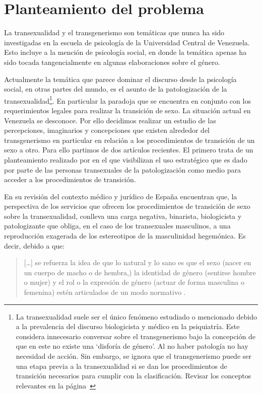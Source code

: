 \section{Planteamiento del problema}

La transexualidad y el transgenerismo son temáticas que nunca ha sido
investigadas en la escuela de psicología de la Universidad Central de Venezuela. Esto incluye a la mención de psicología
social, en donde la temática apenas ha sido tocada tangencialmente en algunas
elaboraciones sobre el género.

Actualmente la temática que parece dominar el discurso desde la psicología
social, en otras partes del mundo, es el asunto de la patologización de la
transexualidad\footnote{La transexualidad suele ser el único fenómeno estudiado
o mencionado debido a la prevalencia del discurso biologicista y médico en la
psiquiatría. Este considera innecesario conversar sobre el transgenerismo bajo
la concepción de que en este no existe una ‘disforía de género’. Al no haber
patología no hay necesidad de acción. Sin embargo, se ignora que el
transgenerismo puede ser una etapa previa a la transexualidad si se dan los
procedimientos de transición necesarios para cumplir con la clasificación.
Revisar los conceptos relevantes en la página~\pageref{diferencia}}. En
particular la paradoja que se encuentra en conjunto con los requerimientos
legales para realizar la transición de sexo. La situación actual en Venezuela se
desconoce. Por ello decidimos realizar un estudio de las percepciones,
imaginarios y concepciones que existen alrededor del transgenerismo en
particular en relación a los procedimientos de transición de un sexo a otro.
Para ello partimos de dos artículos recientes. El primero trata de un
planteamiento realizado por \textcite{Coll-Planas2015} en el que visibilizan el
uso estratégico que es dado por parte de las personas transexuales de la
patologización como medio para acceder a los procedimientos de transición.

En su revisión del contexto médico y jurídico de España encuentran que, la
perspectiva de los servicios que ofrecen los procedimientos de transición de
sexo sobre la transexualidad, conlleva una carga negativa, binarista,
biologicista y patologizante que obliga, en el caso de los transexuales
masculinos, a una reproducción exagerada de los estereotipos de la masculinidad
hegemónica. Es decir, debido a que:

\begin{quote}
[…] se refuerza la idea de que lo natural y lo sano es que el sexo (nacer en un
cuerpo de macho o de hembra,) la identidad de género (sentirse hombre o
mujer) y el rol o la expresión de género (actuar de forma masculina o
femenina) estén articulados de un modo normativo \parencite[][p.
426]{Coll-Planas2015}.
\end{quote}

